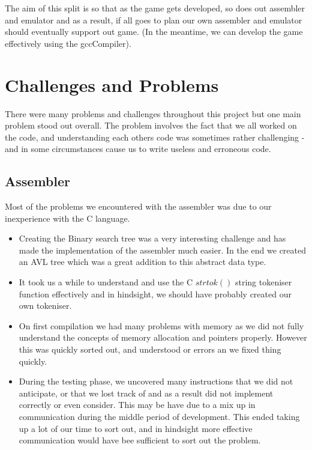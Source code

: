 \documentclass[11pt]{article}
\begin{document}
The aim of this split is so that as the game gets developed, so does out assembler and emulator and as a result, if all goes to plan our own assembler and emulator should eventually support out game. (In the meantime, we can develop the game effectively using the gccCompiler).

\section{Challenges and Problems}
There were many problems and challenges throughout this project but one main problem stood out overall. The problem involves the fact that we all worked on the code, and understanding each others code was sometimes rather challenging - and in some circumstances cause us to write useless and erroneous code.

\subsection{Assembler}
Most of the problems we encountered with the assembler was due to our inexperience with the C language.
\begin{itemize}
\item Creating the Binary search tree was a very interesting challenge and has made the implementation of the assembler much easier. In the end we created an AVL tree which was a great addition to this abstract data type.

\item It took us a while to understand and use the C $strtok()$ string tokeniser function effectively and in hindsight, we should have probably created our own tokeniser.

\item On first compilation we had many problems with memory as we did not fully understand the concepts of memory allocation and pointers properly. However this was quickly sorted out, and understood or errors an we fixed thing quickly.

\item During the testing phase, we uncovered many instructions that we did not anticipate, or that we lost track of and as a result did not implement correctly or even consider. This may be have due to a mix up in communication during the middle period of development. This ended taking up a lot of our time to sort out, and in hindsight more effective communication would have bee sufficient to sort out the problem.

\end{itemize}
\end{document}
